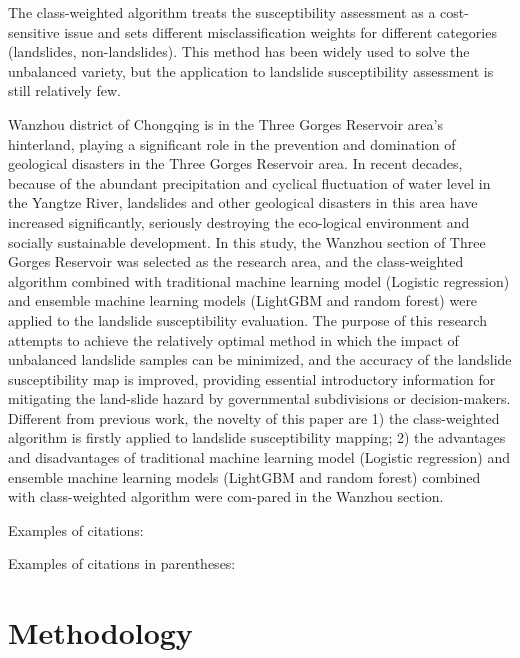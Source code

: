\documentclass[a4paper,fleqn]{cas-sc}
\begin{document}
The class-weighted algorithm treats the susceptibility assessment as a cost-sensitive issue and sets different misclassification weights for different categories (landslides, non-landslides). 
This method has been widely used to solve the unbalanced variety, but the application to landslide susceptibility assessment is still relatively few. 

Wanzhou district of Chongqing is in the Three Gorges Reservoir area's hinterland, playing a significant role in the prevention and domination of geological disasters in the Three Gorges Reservoir area. In recent decades, because of the abundant precipitation and cyclical fluctuation of water level in the Yangtze River, landslides and other geological disasters in this area have increased significantly, seriously destroying the eco-logical environment and socially sustainable development. 
In this study, the Wanzhou section of Three Gorges Reservoir was selected as the research area, and the class-weighted algorithm combined with traditional machine learning model (Logistic regression) and ensemble machine learning models (LightGBM and random forest) were applied to the landslide susceptibility evaluation. 
The purpose of this research attempts to achieve the relatively optimal method in which the impact of unbalanced landslide samples can be minimized, and the accuracy of the landslide susceptibility map is improved, providing essential introductory information for mitigating the land-slide hazard by governmental subdivisions or decision-makers. 
Different from previous work, the novelty of this paper are 1) the class-weighted algorithm is firstly applied to landslide susceptibility mapping; 2) the advantages and disadvantages of traditional machine learning model (Logistic regression) and ensemble machine learning models (LightGBM and random forest) combined with class-weighted algorithm were com-pared in the Wanzhou section.


\label{intro}



Examples of citations:

\cite{gomez1990isim3d, pebesma2004multivariable, hansen2018multiple}

Examples of citations in parentheses: 

\citep{gomez1990isim3d, pebesma2004multivariable, hansen2018multiple}

\section{Methodology}
\end{document}
